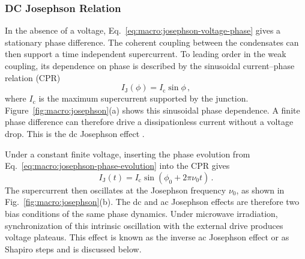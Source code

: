         \subsubsection*{DC Josephson Relation}

            In the absence of a voltage, Eq.~\eqref{eq:macro:josephson-voltage-phase} gives a stationary phase difference. The coherent coupling between the condensates can then support a time independent supercurrent. To leading order in the weak coupling, its dependence on phase is described by the sinusoidal current--phase relation (CPR)
            \begin{equation}
                I_\mathrm{J}(\phi) = I_\mathrm{c}\sin\phi\,,
                \label{eq:macro:josephson-current-phase}
            \end{equation}
            where $I_\mathrm{c}$ is the maximum supercurrent supported by the junction. Figure~\ref{fig:macro:josephson}(a) shows this sinusoidal phase dependence. A finite phase difference can therefore drive a dissipationless current without a voltage drop. This is the dc Josephson effect \cite{josephson_possible_1962}.

            Under a constant finite voltage, inserting the phase evolution from Eq.~\eqref{eq:macro:josephson-phase-evolution} into the CPR gives
            \begin{equation}
                I_\mathrm{J}(t)=I_\mathrm{c}\sin\!\left(\phi_0+2\pi\nu_0t\right)\,.
                \label{eq:macro:josephson-current-evolution}
            \end{equation}
            The supercurrent then oscillates at the Josephson frequency $\nu_0$, as shown in Fig.~\ref{fig:macro:josephson}(b). The dc and ac Josephson effects are therefore two bias conditions of the same phase dynamics. Under microwave irradiation, synchronization of this intrinsic oscillation with the external drive produces voltage plateaus. This effect is known as the inverse ac Josephson effect or as Shapiro steps and is discussed below.

